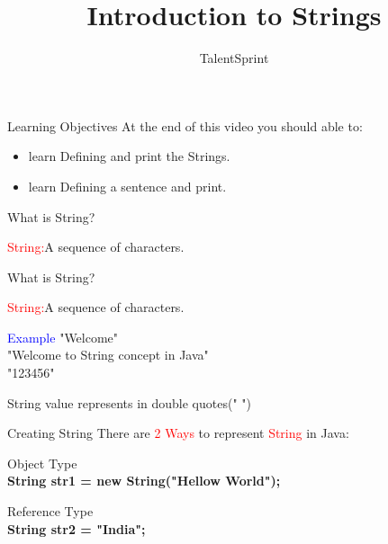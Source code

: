 \documentclass[aspectratio=169,14pt,usenames,dvipsnames]{beamer}
\title[Introduction to Strings]{Introduction to Strings}
\begin{document}
{\1
\begin{frame} \vspace{35pt}

\subtitle{TalentSprint}
\maketitle
\end{frame}
}

\begin{frame}{Learning Objectives}
At the end of this video you should able to:
\begin{itemize}
\item learn Defining and print the Strings.
\item learn Defining a sentence and print.
\end{itemize}
\end{frame}

\begin{frame}{What is String?}
\begin{block}{\textcolor{red}{String:}}A sequence of characters.
\end{block}
\end{frame}

\begin{frame}{What is String?}
\begin{block}{\textcolor{red}{String:}}A sequence of characters.
\end{block}
\begin{block}{\textcolor{blue}{Example}}
"Welcome"\\
"Welcome to String concept in Java"\\
"123456"\\
\end{block}
\color{red}String value represents in double quotes(" ")
\end{frame}



\begin{frame}{Creating String}
There are \textcolor{red}{2 Ways}  to represent \textcolor{red}{String} in Java:\\
\begin{block}{Object Type}\\
\textbf{String str1 = new String("Hellow World");}
\end{block}
\begin{block}{Reference Type}\\
\textbf{String str2 = "India";}
\end{block}
\end{frame}
\end{document}
